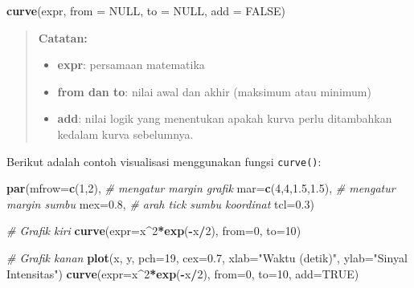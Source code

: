 \documentclass[
]{book}
\newenvironment{Shaded}{\begin{snugshade}}{\end{snugshade}}
\newcommand{\AttributeTok}[1]{\textcolor[rgb]{0.13,0.29,0.53}{#1}}
\newcommand{\CommentTok}[1]{\textcolor[rgb]{0.56,0.35,0.01}{\textit{#1}}}
\newcommand{\ConstantTok}[1]{\textcolor[rgb]{0.56,0.35,0.01}{#1}}
\newcommand{\DecValTok}[1]{\textcolor[rgb]{0.00,0.00,0.81}{#1}}
\newcommand{\FloatTok}[1]{\textcolor[rgb]{0.00,0.00,0.81}{#1}}
\newcommand{\FunctionTok}[1]{\textcolor[rgb]{0.13,0.29,0.53}{\textbf{#1}}}
\newcommand{\NormalTok}[1]{#1}
\newcommand{\SpecialCharTok}[1]{\textcolor[rgb]{0.81,0.36,0.00}{\textbf{#1}}}
\newcommand{\StringTok}[1]{\textcolor[rgb]{0.31,0.60,0.02}{#1}}
\providecommand{\tightlist}{%
  \setlength{\itemsep}{0pt}\setlength{\parskip}{0pt}}
\theoremstyle{definition}
\theoremstyle{definition}
\theoremstyle{definition}
\theoremstyle{definition}
\theoremstyle{remark}
\begin{document}
\begin{Shaded}
\begin{Highlighting}[]
\FunctionTok{curve}\NormalTok{(expr, }\AttributeTok{from =} \ConstantTok{NULL}\NormalTok{, }\AttributeTok{to =} \ConstantTok{NULL}\NormalTok{, }\AttributeTok{add =} \ConstantTok{FALSE}\NormalTok{)}
\end{Highlighting}
\end{Shaded}

\begin{quote}
\textbf{Catatan:}

\begin{itemize}
\tightlist
\item
  \textbf{expr}: persamaan matematika
\item
  \textbf{from dan to}: nilai awal dan akhir (maksimum atau minimum)
\item
  \textbf{add}: nilai logik yang menentukan apakah kurva perlu ditambahkan kedalam kurva sebelumnya.
\end{itemize}
\end{quote}

Berikut adalah contoh visualisasi menggunakan fungsi \texttt{curve()}:

\begin{Shaded}
\begin{Highlighting}[]
\FunctionTok{par}\NormalTok{(}\AttributeTok{mfrow=}\FunctionTok{c}\NormalTok{(}\DecValTok{1}\NormalTok{,}\DecValTok{2}\NormalTok{),}
    \CommentTok{\# mengatur margin grafik}
    \AttributeTok{mar=}\FunctionTok{c}\NormalTok{(}\DecValTok{4}\NormalTok{,}\DecValTok{4}\NormalTok{,}\FloatTok{1.5}\NormalTok{,}\FloatTok{1.5}\NormalTok{),}
    \CommentTok{\# mengatur margin sumbu}
    \AttributeTok{mex=}\FloatTok{0.8}\NormalTok{,}
    \CommentTok{\# arah tick sumbu koordinat}
    \AttributeTok{tcl=}\FloatTok{0.3}\NormalTok{)}

\CommentTok{\# Grafik kiri}
\FunctionTok{curve}\NormalTok{(}\AttributeTok{expr=}\NormalTok{x}\SpecialCharTok{\^{}}\DecValTok{2}\SpecialCharTok{*}\FunctionTok{exp}\NormalTok{(}\SpecialCharTok{{-}}\NormalTok{x}\SpecialCharTok{/}\DecValTok{2}\NormalTok{), }
      \AttributeTok{from=}\DecValTok{0}\NormalTok{, }\AttributeTok{to=}\DecValTok{10}\NormalTok{)}

\CommentTok{\# Grafik kanan}
\FunctionTok{plot}\NormalTok{(x, y, }\AttributeTok{pch=}\DecValTok{19}\NormalTok{, }\AttributeTok{cex=}\FloatTok{0.7}\NormalTok{,}
     \AttributeTok{xlab=}\StringTok{"Waktu (detik)"}\NormalTok{,}
     \AttributeTok{ylab=}\StringTok{"Sinyal Intensitas"}\NormalTok{)}
\FunctionTok{curve}\NormalTok{(}\AttributeTok{expr=}\NormalTok{x}\SpecialCharTok{\^{}}\DecValTok{2}\SpecialCharTok{*}\FunctionTok{exp}\NormalTok{(}\SpecialCharTok{{-}}\NormalTok{x}\SpecialCharTok{/}\DecValTok{2}\NormalTok{), }
      \AttributeTok{from=}\DecValTok{0}\NormalTok{, }\AttributeTok{to=}\DecValTok{10}\NormalTok{, }\AttributeTok{add=}\ConstantTok{TRUE}\NormalTok{)}
\end{Highlighting}
\end{Shaded}
\end{document}
